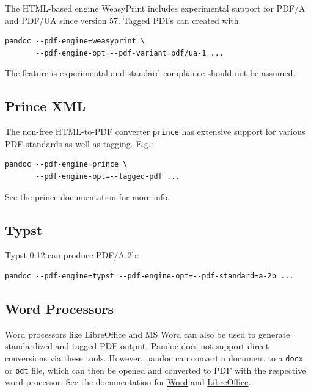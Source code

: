 \documentclass[
]{article}
\begin{document}
The HTML-based engine WeasyPrint includes experimental support for PDF/A
and PDF/UA since version 57. Tagged PDFs can created with

\begin{verbatim}
pandoc --pdf-engine=weasyprint \
       --pdf-engine-opt=--pdf-variant=pdf/ua-1 ...
\end{verbatim}

The feature is experimental and standard compliance should not be
assumed.

\hypertarget{prince-xml}{%
\subsection{Prince XML}\label{prince-xml}}

The non-free HTML-to-PDF converter \texttt{prince} has extensive support
for various PDF standards as well as tagging. E.g.:

\begin{verbatim}
pandoc --pdf-engine=prince \
       --pdf-engine-opt=--tagged-pdf ...
\end{verbatim}

See the prince documentation for more info.

\hypertarget{typst}{%
\subsection{Typst}\label{typst}}

Typst 0.12 can produce PDF/A-2b:

\begin{verbatim}
pandoc --pdf-engine=typst --pdf-engine-opt=--pdf-standard=a-2b ...
\end{verbatim}

\hypertarget{word-processors}{%
\subsection{Word Processors}\label{word-processors}}

Word processors like LibreOffice and MS Word can also be used to
generate standardized and tagged PDF output. Pandoc does not support
direct conversions via these tools. However, pandoc can convert a
document to a \texttt{docx} or \texttt{odt} file, which can then be
opened and converted to PDF with the respective word processor. See the
documentation for
\href{https://support.microsoft.com/en-us/office/create-accessible-pdfs-064625e0-56ea-4e16-ad71-3aa33bb4b7ed}{Word}
and
\href{https://help.libreoffice.org/latest/en-US/text/shared/01/ref_pdf_export_general.html}{LibreOffice}.
\end{document}
